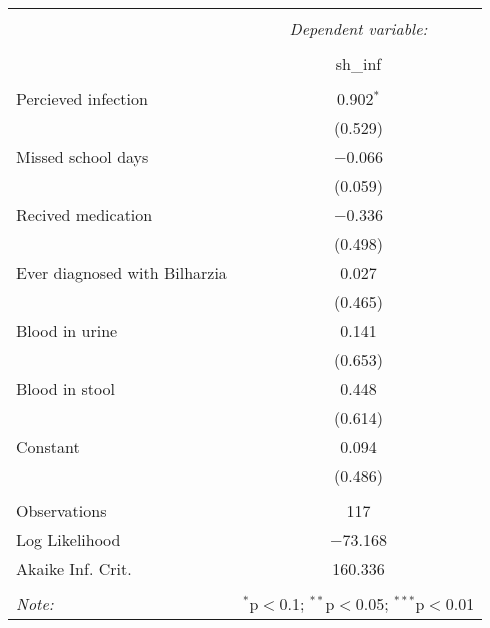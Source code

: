 
\begin{table}[!htbp] \centering 
  \caption{} 
  \label{} 
\begin{tabular}{@{\extracolsep{3pt}}lc} 
\\[-1.8ex]\hline 
\hline \\[-1.8ex] 
 & \multicolumn{1}{c}{\textit{Dependent variable:}} \\ 
\cline{2-2} 
\\[-1.8ex] & sh\_inf \\ 
\hline \\[-1.8ex] 
 Percieved infection & 0.902$^{*}$ \\ 
  & (0.529) \\ 
  Missed school days & $-$0.066 \\ 
  & (0.059) \\ 
  Recived medication & $-$0.336 \\ 
  & (0.498) \\ 
  Ever diagnosed with Bilharzia & 0.027 \\ 
  & (0.465) \\ 
  Blood in urine & 0.141 \\ 
  & (0.653) \\ 
  Blood in stool & 0.448 \\ 
  & (0.614) \\ 
  Constant & 0.094 \\ 
  & (0.486) \\ 
 \hline \\[-1.8ex] 
Observations & 117 \\ 
Log Likelihood & $-$73.168 \\ 
Akaike Inf. Crit. & 160.336 \\ 
\hline 
\hline \\[-1.8ex] 
\textit{Note:}  & \multicolumn{1}{r}{$^{*}$p$<$0.1; $^{**}$p$<$0.05; $^{***}$p$<$0.01} \\ 
\end{tabular} 
\end{table} 
